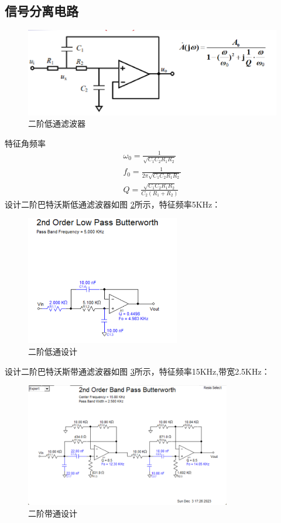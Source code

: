 \documentclass[a4paper]{article}
\theoremstyle{definition}
\theoremstyle{plain}
\theoremstyle{remark}
\newcommand{\reffig}[1]{图 \ref{#1}}
\begin{document}
\subsection{信号分离电路}
\begin{figure}[H]
	\centering
	\includegraphics[width=1\textwidth]{二阶低通滤波器.png}
	\caption{二阶低通滤波器}
	\label{二阶低通滤波器}
\end{figure}
特征角频率
$$
	\begin{aligned}
		\omega_0 = \frac{1}{\sqrt{C_1C_2R_1R_2}} \\
		f_0=\frac{1}{2\pi \sqrt{C_1C_2R_1R_2}}   \\
		Q=\frac{\sqrt{C_1C_2R_1R_2}}{C_2(R_1+R_2)}
	\end{aligned}
$$
设计二阶巴特沃斯低通滤波器如\reffig{二阶低通设计}所示，特征频率5KHz：
\begin{figure}[H]
	\centering
	\includegraphics[width=0.6\textwidth]{二阶低通设计}
	\caption{二阶低通设计}
	\label{二阶低通设计}
\end{figure}
设计二阶巴特沃斯带通滤波器如\reffig{二阶带通设计}所示，特征频率15KHz,带宽2.5KHz：
\begin{figure}[H]
	\centering
	\includegraphics[width=0.8\textwidth]{二阶带通设计}
	\caption{二阶带通设计}
	\label{二阶带通设计}
\end{figure}
\end{document}
